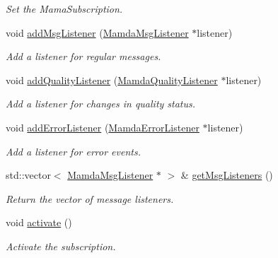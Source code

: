 \begin{CompactItemize}
\begin{CompactList}\small\item\em Set the Mama\-Subscription. \item\end{CompactList}\item 
void \hyperlink{classWombat_1_1MamdaSubscription_9149f71ae1f8be1f36075048be242155}{add\-Msg\-Listener} (\hyperlink{classWombat_1_1MamdaMsgListener}{Mamda\-Msg\-Listener} $\ast$listener)
\begin{CompactList}\small\item\em Add a listener for regular messages. \item\end{CompactList}\item 
void \hyperlink{classWombat_1_1MamdaSubscription_32cde1bfe1d283e945b5f2c596c668ea}{add\-Quality\-Listener} (\hyperlink{classWombat_1_1MamdaQualityListener}{Mamda\-Quality\-Listener} $\ast$listener)
\begin{CompactList}\small\item\em Add a listener for changes in quality status. \item\end{CompactList}\item 
void \hyperlink{classWombat_1_1MamdaSubscription_70152491e3c251e1d21b2708e89fa166}{add\-Error\-Listener} (\hyperlink{classWombat_1_1MamdaErrorListener}{Mamda\-Error\-Listener} $\ast$listener)
\begin{CompactList}\small\item\em Add a listener for error events. \item\end{CompactList}\item 
std::vector$<$ \hyperlink{classWombat_1_1MamdaMsgListener}{Mamda\-Msg\-Listener} $\ast$ $>$ \& \hyperlink{classWombat_1_1MamdaSubscription_691094f8744e5efcd4b7756709cd8c72}{get\-Msg\-Listeners} ()
\begin{CompactList}\small\item\em Return the vector of message listeners. \item\end{CompactList}\item 
void \hyperlink{classWombat_1_1MamdaSubscription_50f691571f680c77ad949f5c162afe35}{activate} ()
\begin{CompactList}\small\item\em Activate the subscription. \item\end{CompactList}\item 

\end{CompactItemize}
